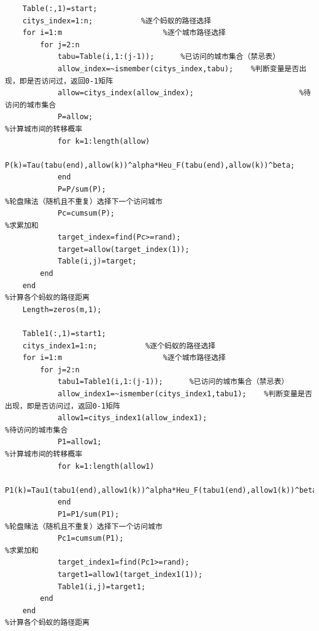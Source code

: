 \documentclass[hyperref,UTF8]{article}
\begin{document}
\begin{lstlisting}
    Table(:,1)=start;
    citys_index=1:n;           %逐个蚂蚁的路径选择
    for i=1:m                       %逐个城市路径选择
        for j=2:n
            tabu=Table(i,1:(j-1));      %已访问的城市集合（禁忌表）
            allow_index=~ismember(citys_index,tabu);    %判断变量是否出现，即是否访问过，返回0-1矩阵
            allow=citys_index(allow_index);                        %待访问的城市集合
            P=allow;                                                            %计算城市间的转移概率
            for k=1:length(allow)
                P(k)=Tau(tabu(end),allow(k))^alpha*Heu_F(tabu(end),allow(k))^beta;
            end
            P=P/sum(P);                                                        %轮盘赌法（随机且不重复）选择下一个访问城市
            Pc=cumsum(P);                                                   %求累加和
            target_index=find(Pc>=rand);                    
            target=allow(target_index(1));
            Table(i,j)=target;
        end
    end                                                                         %计算各个蚂蚁的路径距离
    Length=zeros(m,1);
    
    Table1(:,1)=start1;
    citys_index1=1:n;           %逐个蚂蚁的路径选择
    for i=1:m                       %逐个城市路径选择
        for j=2:n
            tabu1=Table1(i,1:(j-1));      %已访问的城市集合（禁忌表）
            allow_index1=~ismember(citys_index1,tabu1);    %判断变量是否出现，即是否访问过，返回0-1矩阵
            allow1=citys_index1(allow_index1);                        %待访问的城市集合
            P1=allow1;                                                            %计算城市间的转移概率
            for k=1:length(allow1)
                P1(k)=Tau1(tabu1(end),allow1(k))^alpha*Heu_F(tabu1(end),allow1(k))^beta;
            end
            P1=P1/sum(P1);                                                        %轮盘赌法（随机且不重复）选择下一个访问城市
            Pc1=cumsum(P1);                                                   %求累加和
            target_index1=find(Pc1>=rand);                    
            target1=allow1(target_index1(1));
            Table1(i,j)=target1;
        end
    end                                                                         %计算各个蚂蚁的路径距离
    

\end{lstlisting}
\end{document}
